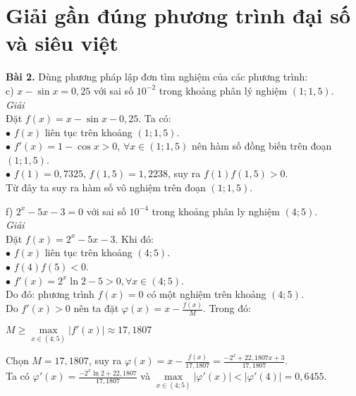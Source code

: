 \chapter{Giải gần đúng phương trình đại số và siêu việt}
\textbf{\color{blue}Bài 2.}  Dùng phương pháp lập đơn tìm nghiệm của các phương trình:\\
c) $x-\sin{x}=0,25$ với sai số $10^{-2}$ trong khoảng phân lý nghiệm $\left(1;1,5\right)$.\\
\textit{Giải}\\
Đặt $f\left(x\right)=x-\sin{x}-0,25 $. Ta có:\\
$\bullet$ $f\left(x\right) $ liên tục trên khoảng $\left(1;1,5\right) $.\\
$\bullet$ $f'\left(x\right)=1-\cos{x}>0$, $\forall x\in \left(1;1,5\right) $ nên hàm số đồng biến trên đoạn $\left(1;1,5\right)$.\\
$\bullet$ $f\left(1\right)= 0,7325$, $f\left(1,5\right)=1,2238 $, suy ra $f\left(1\right)f\left(1,5\right)>0$.\\
Từ đây ta suy ra hàm số vô nghiệm trên đoạn $\left(1;1,5\right) $.\par
\bigskip
f) $2^{x}-5x-3=0$ với sai số $10^{-4} $ trong khoảng phân ly nghiệm $\left(4;5\right) $.\\
\textit{Giải}\\
Đặt $f\left(x\right)=2^{x}-5x-3 $. Khi đó:\\
$\bullet$ $f\left(x\right) $ liên tục trên khoảng $\left(4;5\right) $.\\
$\bullet$ $f\left(4\right)f\left(5\right)<0 $.\\
$\bullet$ $f'\left(x\right)=2^{x}\ln{2}-5 > 0, \forall x \in \left(4;5\right) $.\\
Do đó: phương trình $f\left(x\right)=0  $ có một nghiệm trên khoảng $\left(4;5\right) $.\\
Do $f'\left(x\right)>0 $ nên ta đặt $\varphi\left(x\right)=x-\frac{f\left(x\right)}{M} $. Trong đó:\\
\begin{center} $M\geq \underset{x\in \left(4;5\right) }\max\left| f'\left(x\right) \right| \approx 17,1807 $ \end{center}
Chọn $M=17,1807 $, suy ra $\varphi\left(x\right) =x-\frac{f\left(x\right) }{17,1807} = \frac{-2^{x}+22,1807x + 3}{17,1807}$.\\
Ta có $\varphi ' \left(x\right) = \frac{-2^{x}\ln{2}+22,1807}{17,1807}$ và $\underset{x \in \left(4;5\right)}\max\left| \varphi ' \left(x\right) \right| < \left| \varphi ' \left(4\right) \right| = 0,6455 $.\\
